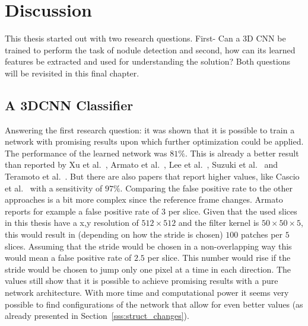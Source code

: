 \documentclass[main.tex]{subfiles}
\begin{document}
\chapter{Discussion}\label{chap:discussion}
This thesis started out with two research questions. First- Can a 3D CNN be trained to perform the task of nodule detection and second, how can its learned features be extracted and used for understanding the solution? Both questions will be revisited in this final chapter.

\section{A 3DCNN Classifier}
Answering the first research question: it was shown that it is possible to train a network with promising results upon which further optimization could be applied. The performance of the learned network was $81\%$. This is already a better result than reported by Xu et al.~\cite{xu1997development}, Armato et al.~\cite{armato1999computerized}, Lee et al.~\cite{lee2001automated}, Suzuki et al.~\cite{suzuki2003massive} and Teramoto et al.~\cite{teramoto2013fast}. But there are also papers that report higher values, like Cascio et al.~\cite{cascio2012automatic} with a sensitivity of $97\%$. Comparing the false positive rate to the other approaches is a bit more complex since the reference frame changes. Armato~\cite{armato1999computerized} reports for example a false positive rate of 3 per slice. Given that the used slices in this thesis have a x,y resolution of $512 \times 512$ and the filter kernel is $50 \times 50 \times 5$, this would result in (depending on how the stride is chosen) $100$ patches per $5$ slices. Assuming that the stride would be chosen in a non-overlapping way this would mean a false positive rate of $2.5$ per slice. This number would rise if the stride would be chosen to jump only one pixel at a time in each direction. The values still show that it is possible to achieve promising results with a pure network architecture. With more time and computational power it seems very possible to find configurations of the network that allow for even better values (as already presented in Section~\ref{sss:struct_changes}). 
\end{document}
